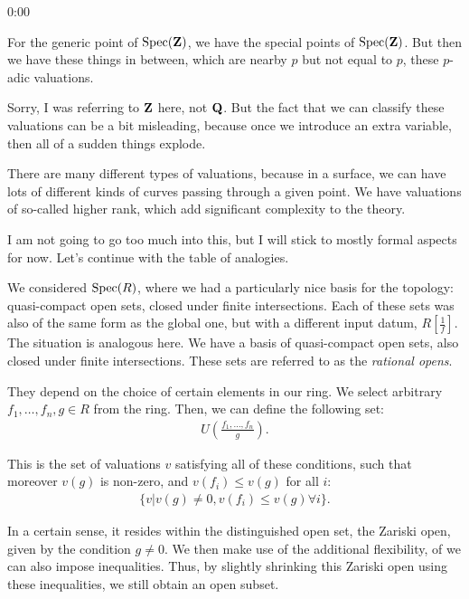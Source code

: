 \begin{unfinished}{0:00}
\begin{example}
For the generic point of $\operatorname{Spec}(\mathbf Z)$, we have the special points of $\operatorname{Spec}(\mathbf Z)$. But then we have these things in between, which are nearby $p$ but not equal to $p$, these $p$-adic valuations.

Sorry, I was referring to $\mathbf Z$ here, not $\mathbf Q$. But the fact that we can classify these valuations can be a bit misleading, because once we introduce an extra variable, then all of a sudden things explode.

There are many different types of valuations, because in a surface, we can have lots of different kinds of curves passing through a given point. We have valuations of so-called higher rank, which add significant complexity to the theory. 

\end{example}

I am not going to go too much into this, but I will stick to mostly formal aspects for now. Let's continue with the table of analogies.

We considered $\operatorname{Spec}(R)$, where we had a particularly nice basis for the topology: quasi-compact open sets, closed under finite intersections. Each of these sets was also of the same form as the global one, but with a different input datum, $R[\frac{1}{f}]$. 
The situation is analogous here. We have a basis of quasi-compact open sets, also closed under finite intersections. These sets are referred to as the \emph{rational opens}. 

They depend on the choice of certain elements in our ring. We select arbitrary $f_1, \ldots, f_n, g \in R$ from the ring. Then, we can define the following set:
\begin{align*}
U(\frac{f_1, \ldots, f_n}{g}).
\end{align*}

This is the set of valuations $v$ satisfying all of these conditions, such that moreover $v(g)$ is non-zero, and $v(f_i) \leq v(g)$ for all $i$:
\begin{align*}
\{ v | v(g) \neq 0,  v(f_i) \leq v(g) \forall i \}.
\end{align*}

In a certain sense, it resides within the distinguished open set, the Zariski open, given by the condition $g \neq 0$. We then make use of the additional flexibility, of  we can also impose inequalities.
Thus, by slightly shrinking this Zariski open using these inequalities, we still obtain an open subset.


\end{unfinished}
